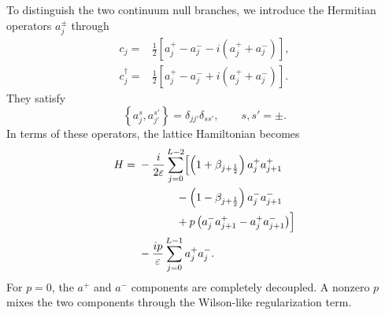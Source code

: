 \documentclass[reprint,amsmath,amssymb,aps,prb,floatfix,showkeys,superscriptaddress]{revtex4-2}
\begin{document}
To distinguish the two continuum null branches, we introduce the
Hermitian operators $a_j^\pm$ through
\begin{subequations}
\label{eq:a_definition}
\begin{align}
  c_j
  ={}&
  \frac{1}{2}
  \left[
    a_j^+-a_j^-
    -i\left(a_j^++a_j^-\right)
  \right],
  \\
  c_j^\dagger
  ={}&
  \frac{1}{2}
  \left[
    a_j^+-a_j^-
    +i\left(a_j^++a_j^-\right)
  \right].
\end{align}
\end{subequations}
They satisfy
\begin{equation}
  \left\{
    a_j^s,a_{j'}^{s'}
  \right\}
  =
  \delta_{jj'}\delta_{ss'},
  \qquad
  s,s'=\pm.
  \label{eq:a_anticommutation}
\end{equation}
In terms of these operators, the lattice Hamiltonian becomes
\begin{align}
  H
  ={}&
  -\frac{i}{2\varepsilon}
  \sum_{j=0}^{L-2}
  \Bigl[
    \left(
      1+\beta_{j+\frac12}
    \right)
    a_j^+a_{j+1}^+
  \nonumber\\
  &\hspace{12mm}
    -
    \left(
      1-\beta_{j+\frac12}
    \right)
    a_j^-a_{j+1}^-
  \nonumber\\
  &\hspace{12mm}
    +
    p\left(
      a_j^-a_{j+1}^+
      -
      a_j^+a_{j+1}^-
    \right)
  \Bigr]
  \nonumber\\
  &-
  \frac{i p}{\varepsilon}
  \sum_{j=0}^{L-1}
  a_j^+a_j^- .
  \label{eq:H_in_a}
\end{align}
For $p=0$, the $a^+$ and $a^-$ components are completely
decoupled. A nonzero $p$ mixes the two components through the
Wilson-like regularization term.
\end{document}
